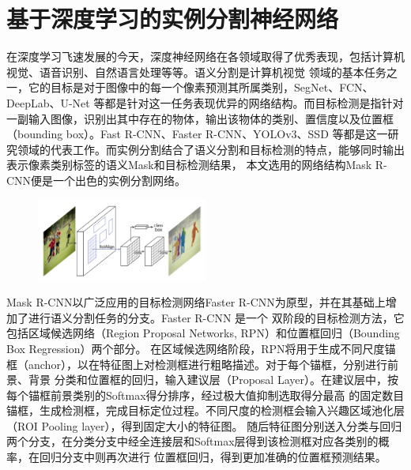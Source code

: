 \section{基于深度学习的实例分割神经网络}

在深度学习飞速发展的今天，深度神经网络在各领域取得了优秀表现，包括计算机视觉、语音识别、自然语言处理等等。语义分割是计算机视觉
领域的基本任务之一，它的目标是对于图像中的每一个像素预测其所属类别，SegNet\citep{VijaySegNet}、FCN\citep{long2015fully}、DeepLab\citep{chen2018encoder}\citep{Chen2014Semantic}、U-Net\citep{ronneberger2015u}
等都是针对这一任务表现优异的网络结构。而目标检测是指针对一副输入图像，识别出其中存在的物体，输出该物体的类别、置信度以及位置框
（bounding box）。Fast R-CNN\citep{girshick2015fast}、Faster R-CNN\citep{ren2015faster}、YOLOv3\citep{redmon2018yolov3}、SSD\citep{Liu2016SSD}
等都是这一研究领域的代表工作。而实例分割结合了语义分割和目标检测的特点，能够同时输出表示像素类别标签的语义Mask和目标检测结果，
本文选用的网络结构Mask R-CNN\citep{HeMask}便是一个出色的实例分割网络。
\begin{figure}[!htbp]
    \centering
    \includegraphics[width=0.5\textwidth]{Img/2-maskRCNN.png}
    \label{fig:maskRCNN}
\end{figure}
Mask R-CNN以广泛应用的目标检测网络Faster R-CNN为原型，并在其基础上增加了进行语义分割任务的分支。Faster R-CNN 是一个
双阶段的目标检测方法，它包括区域候选网络（Region Proposal Networks, RPN）和位置框回归（Bounding Box Regression）两个部分。
在区域候选网络阶段，RPN将用于生成不同尺度锚框（anchor），以在特征图上对检测框进行粗略描述。对于每个锚框，分别进行前景、背景
分类和位置框的回归，输入建议层（Proposal Layer）。在建议层中，按每个锚框前景类别的Softmax得分排序，经过极大值抑制选取得分最高
的固定数目锚框，生成检测框，完成目标定位过程。不同尺度的检测框会输入兴趣区域池化层（ROI Pooling layer），得到固定大小的特征图。
随后特征图分别送入分类与回归两个分支，在分类分支中经全连接层和Softmax层得到该检测框对应各类别的概率，在回归分支中则再次进行
位置框回归，得到更加准确的位置框预测结果。
